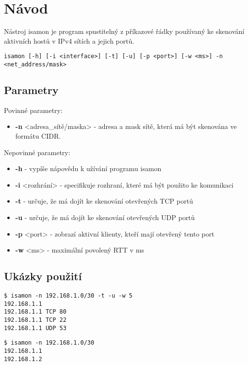\documentclass[../projekt.tex]{subfiles}
\begin{document}
\chapter{Návod}

Nástroj isamon je program spustitelný z příkazové řádky používaný ke skenování aktivních hostů v IPv4 sítích a jejich portů.


\begin{lstlisting}[caption=Možnosti použití nástroje isamon.]
isamon [-h] [-i <interface>] [-t] [-u] [-p <port>] [-w <ms>] -n <net_address/mask>
\end{lstlisting}

\section{Parametry}

Povinné parametry:
\begin{itemize}
    \item \textbf{-n} <adresa\_sítě/maska> - adresa a mask sítě, která má být skenována ve formátu CIDR\cite{RFC4632}.  
\end{itemize}

Nepovinné parametry:
\begin{itemize}
    \item \textbf{-h} - vypíše nápovědu k užívání programu isamon
    \item \textbf{-i} <rozhrání> - specifikuje rozhraní, které má být použito ke komunikaci
    \item \textbf{-t} - určuje, že má dojít ke skenování otevřených TCP portů
    \item \textbf{-u} - určuje, že má dojít ke skenování otevřených UDP portů
    \item \textbf{-p} <port> - zobrazí aktivní klienty, kteří mají otevřený tento port
    \item \textbf{-w} <ms> - maximální povolený RTT v ms
\end{itemize}


\section{Ukázky použití}

\begin{lstlisting}[caption=Ukázka použití isamon pro skenování TCP a UDP portů sítě 192.168.1.0/30 s maximálním RTT 5 ms.]
$ isamon -n 192.168.1.0/30 -t -u -w 5 
192.168.1.1
192.168.1.1 TCP 80
192.168.1.1 TCP 22
192.168.1.1 UDP 53
\end{lstlisting}

\begin{lstlisting}[caption=Ukázka použití isamon pro skenování aktivních hostů na síti 192.168.1.0/30.]
$ isamon -n 192.168.1.0/30
192.168.1.1
192.168.1.2
\end{lstlisting}
\end{document}
